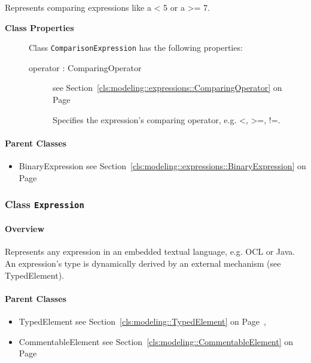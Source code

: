 	
			
Represents comparing expressions like a < 5 or a >= 7.	
		
	


\begin{description}

	\item[\textbf{Class Properties}] Class \texttt{ComparisonExpression} has the following properties:
	\begin{description}
\item[operator : ComparingOperator 	]
see Section~\ref{cls:modeling::expressions::ComparingOperator} on Page~\pageref{cls:modeling::expressions::ComparingOperator}\hspace{\fill}
\nopagebreak


	
			
Specifies the expression's comparing operator, e.g. <, >=, !=.	
		
	
	\end{description}
	
	

\end{description}

\paragraph{Parent Classes}
\begin{itemize}
\item BinaryExpression see Section~\ref{cls:modeling::expressions::BinaryExpression} on Page~\pageref{cls:modeling::expressions::BinaryExpression}\end{itemize}
\subsubsection{\Large{Class \bfseries \texttt{Expression}\normalfont}}
\label{cls:modeling::expressions::Expression} 
\paragraph{Overview}

	
			
Represents any expression in an embedded textual language, e.g. OCL or Java. An expression's type is dynamically derived by an external mechanism (see TypedElement).	
		
	



\paragraph{Parent Classes}
\begin{itemize}
\item TypedElement see Section~\ref{cls:modeling::TypedElement} on Page~\pageref{cls:modeling::TypedElement}, \item CommentableElement see Section~\ref{cls:modeling::CommentableElement} on Page~\pageref{cls:modeling::CommentableElement}\end{itemize}
